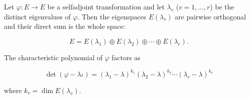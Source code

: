 Let $\varphi: E \rightarrow E$ be a selfadjoint transformation and let $\lambda_v$ ($v = 1, \ldots, r$) be the distinct eigenvalues of $\varphi$. Then the eigenspaces $E(\lambda_v)$ are pairwise orthogonal and their direct sum is the whole space:

$$E = E(\lambda_1) \oplus E(\lambda_2) \oplus \cdots \oplus E(\lambda_r).$$

The characteristic polynomial of $\varphi$ factors as

$$\det(\varphi - \lambda \iota) = (\lambda_1 - \lambda)^{k_1} (\lambda_2 - \lambda)^{k_2} \cdots (\lambda_r - \lambda)^{k_r}$$

where $k_v = \dim E(\lambda_v)$.
